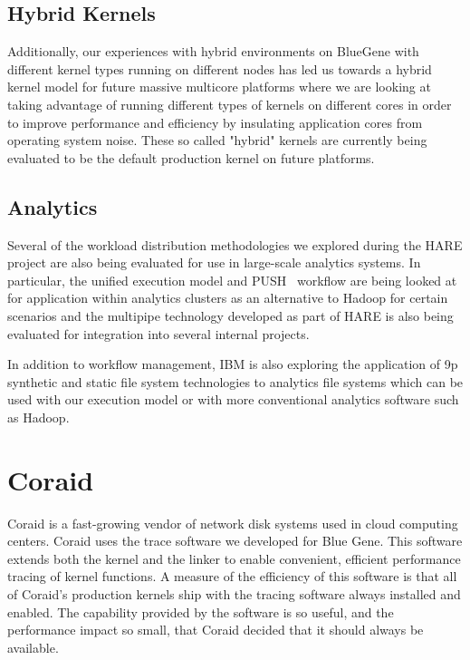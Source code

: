 \subsection{Hybrid Kernels}

Additionally, our experiences with hybrid environments on BlueGene with different kernel
types running on different nodes has led us towards a hybrid kernel model for future
massive multicore platforms where we are looking at taking advantage of running different
types of kernels on different cores in order to improve performance and efficiency by
insulating application cores from operating system noise.  These so called "hybrid" kernels
are currently being evaluated to be the default production kernel on future platforms.

\subsection{Analytics}

Several of the workload distribution methodologies we explored 
during the HARE project are also being evaluated for use in large-scale
analytics systems.  In particular, the unified execution model and PUSH~\cite{PUSH}
workflow are being looked at for application within analytics clusters as an alternative to
Hadoop for certain scenarios and the multipipe technology developed as part of HARE is
also being evaluated for integration into several internal projects.

In addition to workflow management, IBM is also exploring the application of
9p synthetic and static file system technologies to analytics file systems which
can be used with our execution model or with more conventional analytics software
such as Hadoop. 

\section{Coraid}
Coraid is a fast-growing vendor of network disk systems used in cloud computing centers. 
Coraid uses the trace software we developed\cite{plan9trace} for Blue Gene. 
This software extends both the kernel and the linker to enable convenient, efficient 
performance tracing of kernel functions. A measure of the efficiency of this software 
is that  all of Coraid's production
kernels ship with the tracing software always installed and enabled. 
The capability provided by the software is so useful, and the performance impact so small, 
that Coraid decided that it should always be available. 

